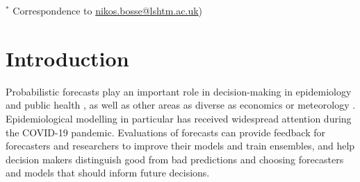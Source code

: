 \documentclass{article}
\begin{document}
\bigskip

{\footnotesize $^*$ Correspondence to \url{nikos.bosse@lshtm.ac.uk})}



\newpage


\section{Introduction}

Probabilistic forecasts \citep{heldProbabilisticForecastingInfectious2017} play an important role in decision-making in epidemiology and public health \citep{reichCollaborativeMultiyearMultimodel2019, funkShorttermForecastsInform2020, cramerEvaluationIndividualEnsemble2021, bracherShorttermForecastingCOVID192021, europeancovid-19forecasthubEuropeanCovid19Forecast2021, sherrattPredictivePerformanceMultimodel2022}, as well as other areas as diverse as economics \citep{timmermannForecastingMethodsFinance2018, elliottForecastingEconomicsFinance2016} or meteorology \citep{gneitingWeatherForecastingEnsemble2005, kukkonenReviewOperationalRegionalscale2012}. Epidemiological modelling in particular has received widespread attention during the COVID-19 pandemic. Evaluations of forecasts can provide feedback for forecasters and researchers to improve their models and train ensembles, and help decision makers distinguish good from bad predictions and choosing forecasters and models that should inform future decisions.
\end{document}
